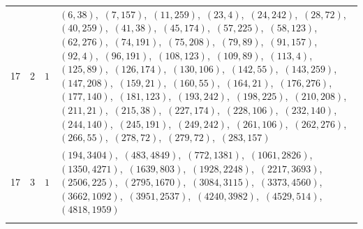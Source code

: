 \documentclass[11pt]{article}
\begin{document}
\begin{longtable}{@{}rrl>{\raggedright\arraybackslash}p{}@{}}
17 & 2 & $1$ & $(6,38)$,\allowbreak\ $(7,157)$,\allowbreak\ $(11,259)$,\allowbreak\ $(23,4)$,\allowbreak\ $(24,242)$,\allowbreak\ $(28,72)$,\allowbreak\ $(40,259)$,\allowbreak\ $(41,38)$,\allowbreak\ $(45,174)$,\allowbreak\ $(57,225)$,\allowbreak\ $(58,123)$,\allowbreak\ $(62,276)$,\allowbreak\ $(74,191)$,\allowbreak\ $(75,208)$,\allowbreak\ $(79,89)$,\allowbreak\ $(91,157)$,\allowbreak\ $(92,4)$,\allowbreak\ $(96,191)$,\allowbreak\ $(108,123)$,\allowbreak\ $(109,89)$,\allowbreak\ $(113,4)$,\allowbreak\ $(125,89)$,\allowbreak\ $(126,174)$,\allowbreak\ $(130,106)$,\allowbreak\ $(142,55)$,\allowbreak\ $(143,259)$,\allowbreak\ $(147,208)$,\allowbreak\ $(159,21)$,\allowbreak\ $(160,55)$,\allowbreak\ $(164,21)$,\allowbreak\ $(176,276)$,\allowbreak\ $(177,140)$,\allowbreak\ $(181,123)$,\allowbreak\ $(193,242)$,\allowbreak\ $(198,225)$,\allowbreak\ $(210,208)$,\allowbreak\ $(211,21)$,\allowbreak\ $(215,38)$,\allowbreak\ $(227,174)$,\allowbreak\ $(228,106)$,\allowbreak\ $(232,140)$,\allowbreak\ $(244,140)$,\allowbreak\ $(245,191)$,\allowbreak\ $(249,242)$,\allowbreak\ $(261,106)$,\allowbreak\ $(262,276)$,\allowbreak\ $(266,55)$,\allowbreak\ $(278,72)$,\allowbreak\ $(279,72)$,\allowbreak\ $(283,157)$\\
17 & 3 & $1$ & $(194,3404)$,\allowbreak\ $(483,4849)$,\allowbreak\ $(772,1381)$,\allowbreak\ $(1061,2826)$,\allowbreak\ $(1350,4271)$,\allowbreak\ $(1639,803)$,\allowbreak\ $(1928,2248)$,\allowbreak\ $(2217,3693)$,\allowbreak\ $(2506,225)$,\allowbreak\ $(2795,1670)$,\allowbreak\ $(3084,3115)$,\allowbreak\ $(3373,4560)$,\allowbreak\ $(3662,1092)$,\allowbreak\ $(3951,2537)$,\allowbreak\ $(4240,3982)$,\allowbreak\ $(4529,514)$,\allowbreak\ $(4818,1959)$\\
\addlinespace[3pt]
\end{longtable}
\endgroup
\end{document}

